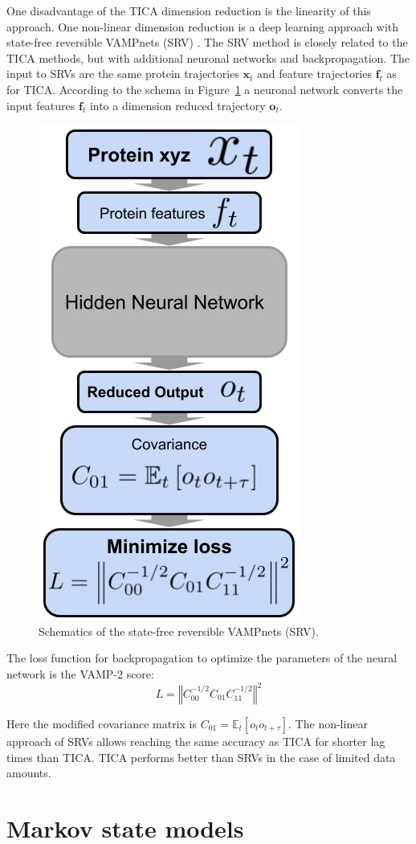 One disadvantage of the TICA dimension reduction is the linearity of this approach. One non-linear dimension reduction is a deep learning approach with state-free reversible VAMPnets (SRV) \cite{Mardt2018,chen2019jcp}. The SRV method is closely related to the TICA methods, but with additional neuronal networks and backpropagation. The input to SRVs are the same protein trajectories $\mathbf{x}_{t}$ and feature trajectories $\mathbf{f}_{t}$ as for TICA. According to the schema in Figure~\ref{fig:NN} a neuronal network converts the input features $\mathbf{f}_{t}$ into a dimension reduced trajectory $\mathbf{o}_{t}$.

\begin{figure}[H]
  \centering
  \includegraphics[width=0.4\linewidth]{figures3/NN.png}
  \caption{Schematics of the state-free reversible VAMPnets (SRV).}
  \label{fig:NN}
\end{figure}


The loss function for backpropagation to optimize the parameters of the neural network is the VAMP-2 score:
$$L=\left\Vert C_{00}^{-1/2}C_{01}C_{11}^{-1/2}\right\Vert ^{2}$$

Here the modified covariance matrix is $C_{01}=\ensuremath{\mathbb{E}}_{t}\left[o_{t}o_{t+\tau}\right]$.
The non-linear approach of SRVs allows reaching the same accuracy as TICA for shorter lag times than TICA. TICA performs better than SRVs in the case of limited data amounts.

\section{Markov state models}

